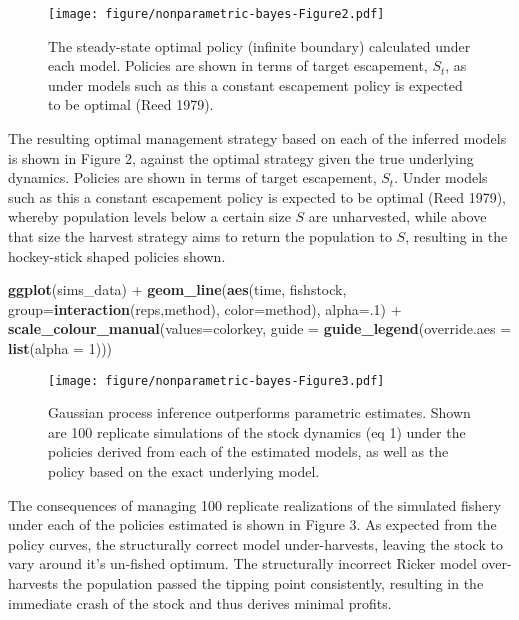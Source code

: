 \documentclass[author-year, review]{elsarticle} %
\makeatletter
\newenvironment{Shaded}{}{}
\newcommand{\KeywordTok}[1]{\textcolor[rgb]{0.00,0.44,0.13}{\textbf{{#1}}}}
\newcommand{\DataTypeTok}[1]{\textcolor[rgb]{0.56,0.13,0.00}{{#1}}}
\newcommand{\DecValTok}[1]{\textcolor[rgb]{0.25,0.63,0.44}{{#1}}}
\newcommand{\NormalTok}[1]{{#1}}
\def\maxwidth{\ifdim\Gin@nat@width>\linewidth\linewidth
\else\Gin@nat@width\fi}
\let\Oldincludegraphics\includegraphics
\renewcommand{\includegraphics}[1]{\Oldincludegraphics[width=\maxwidth]{#1}}
\makeatother
\begin{document}
\begin{figure}[htbp]
\centering
\texttt{[image: figure/nonparametric-bayes-Figure2.pdf]}
\caption{The steady-state optimal policy (infinite boundary) calculated
under each model. Policies are shown in terms of target escapement,
$S_t$, as under models such as this a constant escapement policy is
expected to be optimal (Reed 1979).}
\end{figure}

The resulting optimal management strategy based on each of the inferred
models is shown in Figure 2, against the optimal strategy given the true
underlying dynamics. Policies are shown in terms of target escapement,
$S_t$. Under models such as this a constant escapement policy is
expected to be optimal (Reed 1979), whereby population levels below a
certain size $S$ are unharvested, while above that size the harvest
strategy aims to return the population to $S$, resulting in the
hockey-stick shaped policies shown.

\begin{Shaded}
\begin{Highlighting}[]
\KeywordTok{ggplot}\NormalTok{(sims_data) + }
  \KeywordTok{geom_line}\NormalTok{(}\KeywordTok{aes}\NormalTok{(time, fishstock, }\DataTypeTok{group=}\KeywordTok{interaction}\NormalTok{(reps,method), }\DataTypeTok{color=}\NormalTok{method), }\DataTypeTok{alpha=}\NormalTok{.}\DecValTok{1}\NormalTok{) +}
  \KeywordTok{scale_colour_manual}\NormalTok{(}\DataTypeTok{values=}\NormalTok{colorkey, }\DataTypeTok{guide =} \KeywordTok{guide_legend}\NormalTok{(}\DataTypeTok{override.aes =} \KeywordTok{list}\NormalTok{(}\DataTypeTok{alpha =} \DecValTok{1}\NormalTok{)))}
\end{Highlighting}
\end{Shaded}

\begin{figure}[htbp]
\centering
\texttt{[image: figure/nonparametric-bayes-Figure3.pdf]}
\caption{Gaussian process inference outperforms parametric estimates.
Shown are 100 replicate simulations of the stock dynamics (eq 1) under
the policies derived from each of the estimated models, as well as the
policy based on the exact underlying model.}
\end{figure}

The consequences of managing 100 replicate realizations of the simulated
fishery under each of the policies estimated is shown in Figure 3. As
expected from the policy curves, the structurally correct model
under-harvests, leaving the stock to vary around it's un-fished optimum.
The structurally incorrect Ricker model over-harvests the population
passed the tipping point consistently, resulting in the immediate crash
of the stock and thus derives minimal profits.
\end{document}
